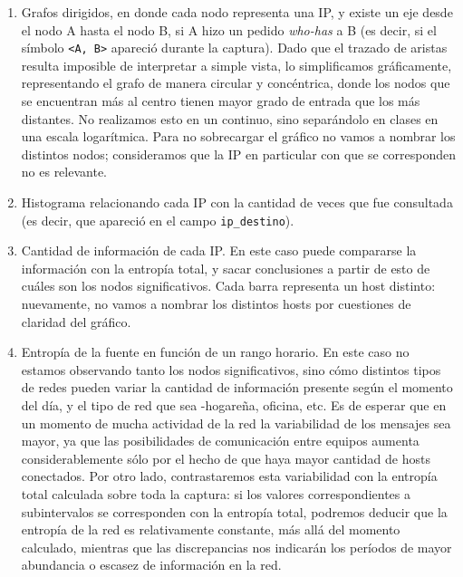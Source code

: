 \begin{enumerate}
 \item Grafos dirigidos, en donde cada nodo representa una IP, y existe un eje desde el nodo A hasta el nodo B, si A hizo un pedido \emph{who-has} a B (es decir, si el s\'imbolo \texttt{<A, B>} apareci\'o durante la captura). Dado que el trazado de aristas resulta imposible de interpretar a simple vista, lo simplificamos gráficamente, representando el grafo de manera circular y concéntrica, donde los nodos que se encuentran más al centro tienen mayor grado de entrada que los más distantes. No realizamos esto en un continuo, sino separándolo en clases en una escala logarítmica. Para no sobrecargar el gr\'afico no vamos a nombrar los distintos nodos;  consideramos que la IP en particular con que se corresponden no es relevante.
 
 \item Histograma relacionando cada IP con la cantidad de veces que fue consultada (es decir, que apareci\'o en el campo \texttt{ip\_destino}).
 
 \item Cantidad de informaci\'on de cada IP. En este caso puede compararse la informaci\'on con la entrop\'ia total, y sacar conclusiones a partir de esto de cu\'ales son los nodos significativos. Cada barra representa un host distinto: nuevamente, no vamos a nombrar los distintos hosts por cuestiones de claridad del gr\'afico.
 
 \item Entrop\'ia de la fuente en funci\'on de un rango horario. En este caso no estamos observando tanto los nodos significativos, sino c\'omo distintos tipos de redes pueden variar la cantidad de informaci\'on presente seg\'un el momento del d\'ia, y el tipo de red que sea -hogare\~na, oficina, etc. Es de esperar que en un momento de mucha actividad de la red la variabilidad de los mensajes sea mayor, ya que las posibilidades de comunicación entre equipos aumenta considerablemente sólo por el hecho de que haya mayor cantidad de hosts conectados. Por otro lado, contrastaremos esta variabilidad con la entropía total calculada sobre toda la captura: si los valores correspondientes a subintervalos se corresponden con la entropía total, podremos deducir que la entropía de la red es relativamente constante, más allá del momento calculado, mientras que las discrepancias nos indicarán los períodos de mayor abundancia o escasez de información en la red.
 

\end{enumerate}
